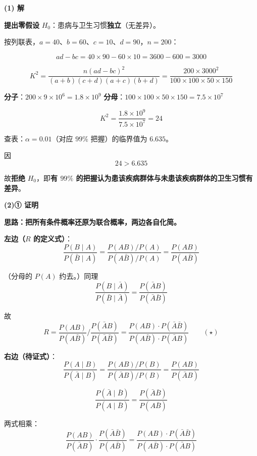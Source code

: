 \begin{answer}
\par\medskip

\textbf{(1) 解}

\textbf{提出零假设} $H_0$：患病与卫生习惯\textbf{独立}（无差异）。

按列联表，$a=40$、$b=60$、$c=10$、$d=90$，$n=200$：

\nopagebreak[4]
\[ad-bc=40\times90-60\times10=3600-600=3000\]

\nopagebreak[4]
\[K^{2}=\frac{n(ad-bc)^{2}}{(a+b)(c+d)(a+c)(b+d)}=\frac{200\times3000^{2}}{100\times100\times50\times150}\]

\textbf{分子}：$200\times9\times10^{6}=1.8\times10^{9}$
\textbf{分母}：$100\times100\times50\times150=7.5\times10^{7}$

\nopagebreak[4]
\[K^{2}=\frac{1.8\times10^{9}}{7.5\times10^{7}}=24\]

查表：$\alpha=0.01$（对应 $99\%$ 把握）的临界值为 $6.635$。

因
\nopagebreak[4]
\[24>6.635\]

故\textbf{拒绝} $H_0$，即\textbf{有 $99\%$ 的把握认为患该疾病群体与未患该疾病群体的卫生习惯有差异}。

\par\medskip

\textbf{(2)① 证明}

\textbf{思路：把所有条件概率还原为联合概率，两边各自化简。}

\textbf{左边（$R$ 的定义式）}：
\nopagebreak[4]
\[\frac{P(B\mid A)}{P(\bar B\mid A)}=\frac{P(AB)/P(A)}{P(A\bar B)/P(A)}=\frac{P(AB)}{P(A\bar B)}\]

（分母的 $P(A)$ 约去。）同理
\nopagebreak[4]
\[\frac{P(B\mid\bar A)}{P(\bar B\mid\bar A)}=\frac{P(\bar AB)}{P(\bar A\bar B)}\]

故
\nopagebreak[4]
\[R=\frac{P(AB)}{P(A\bar B)}\Big/\frac{P(\bar AB)}{P(\bar A\bar B)}=\frac{P(AB)\cdot P(\bar A\bar B)}{P(A\bar B)\cdot P(\bar AB)}\qquad(\star)\]

\textbf{右边（待证式）}：
\nopagebreak[4]
\[\frac{P(A\mid B)}{P(\bar A\mid B)}=\frac{P(AB)/P(B)}{P(\bar AB)/P(B)}=\frac{P(AB)}{P(\bar AB)}\]

\nopagebreak[4]
\[\frac{P(\bar A\mid\bar B)}{P(A\mid\bar B)}=\frac{P(\bar A\bar B)}{P(A\bar B)}\]

两式相乘：
\nopagebreak[4]
\[\frac{P(AB)}{P(\bar AB)}\cdot\frac{P(\bar A\bar B)}{P(A\bar B)}=\frac{P(AB)\cdot P(\bar A\bar B)}{P(A\bar B)\cdot P(\bar AB)}\]


\end{answer}
